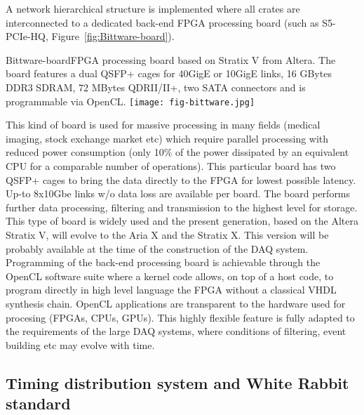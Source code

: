 A network hierarchical structure is implemented where all crates are
interconnected to a dedicated back-end FPGA processing board (such as
S5-PCIe-HQ, Figure~\ref{fig:Bittware-board}). 
\begin{cdrfigure}{Bittware-board}{\small FPGA processing board based on Stratix V from Altera. The board features a dual QSFP+ cages for 40GigE or 10GigE links, 16 GBytes DDR3 SDRAM, 72 MBytes QDRII/II+, two SATA connectors and is programmable via OpenCL.}
\texttt{[image: fig-bittware.jpg]}
\end{cdrfigure}
This kind of board is used for massive processing in many fields
(medical imaging, stock exchange market etc) which require parallel
processing with reduced power consumption (only 10\% of the power
dissipated by an equivalent CPU for a comparable number of
operations). This particular board has two QSFP+ cages to bring the
data directly to the FPGA for lowest possible latency. Up-to 8x10Gbe
links w/o data loss are available per board.  The board performs
further data processing, filtering and transmission to the highest
level for storage. This type of board is widely used and the present
generation, based on the Altera Stratix V, will evolve to the Aria X
and the Stratix X. This version will be probably available at the time
of the construction of the DAQ system. Programming of the back-end
processing board is achievable through the OpenCL software suite where
a kernel code allows, on top of a host code, to program directly in
high level language the FPGA without a classical VHDL synthesis
chain. OpenCL applications are transparent to the hardware used for
procesing (FPGAs, CPUs, GPUs). This highly flexible feature is fully
adapted to the requirements of the large DAQ systems, where conditions
of filtering, event building etc may evolve with time.
 
\subsection{Timing distribution system and White Rabbit standard}

